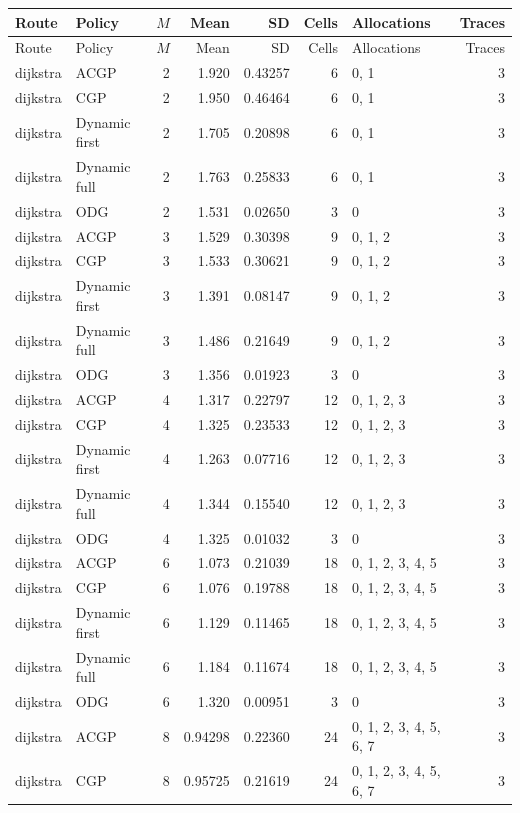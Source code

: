 \documentclass[10pt,a4paper]{article}
\begin{document}
\tiny\setlength{\tabcolsep}{2pt}\begin{longtable}{@{}p{23mm}p{29mm}rrrrp{36mm}r@{}}
\toprule Route & Policy & $M$ & Mean & SD & Cells & Allocations & Traces \\ \midrule\endfirsthead
\toprule Route & Policy & $M$ & Mean & SD & Cells & Allocations & Traces \\ \midrule\endhead
\bottomrule\endfoot
dijkstra & ACGP & 2 & 1.920 & 0.43257 & 6 & 0, 1 & 3 \\
dijkstra & CGP & 2 & 1.950 & 0.46464 & 6 & 0, 1 & 3 \\
dijkstra & Dynamic first & 2 & 1.705 & 0.20898 & 6 & 0, 1 & 3 \\
dijkstra & Dynamic full & 2 & 1.763 & 0.25833 & 6 & 0, 1 & 3 \\
dijkstra & ODG & 2 & 1.531 & 0.02650 & 3 & 0 & 3 \\
dijkstra & ACGP & 3 & 1.529 & 0.30398 & 9 & 0, 1, 2 & 3 \\
dijkstra & CGP & 3 & 1.533 & 0.30621 & 9 & 0, 1, 2 & 3 \\
dijkstra & Dynamic first & 3 & 1.391 & 0.08147 & 9 & 0, 1, 2 & 3 \\
dijkstra & Dynamic full & 3 & 1.486 & 0.21649 & 9 & 0, 1, 2 & 3 \\
dijkstra & ODG & 3 & 1.356 & 0.01923 & 3 & 0 & 3 \\
dijkstra & ACGP & 4 & 1.317 & 0.22797 & 12 & 0, 1, 2, 3 & 3 \\
dijkstra & CGP & 4 & 1.325 & 0.23533 & 12 & 0, 1, 2, 3 & 3 \\
dijkstra & Dynamic first & 4 & 1.263 & 0.07716 & 12 & 0, 1, 2, 3 & 3 \\
dijkstra & Dynamic full & 4 & 1.344 & 0.15540 & 12 & 0, 1, 2, 3 & 3 \\
dijkstra & ODG & 4 & 1.325 & 0.01032 & 3 & 0 & 3 \\
dijkstra & ACGP & 6 & 1.073 & 0.21039 & 18 & 0, 1, 2, 3, 4, 5 & 3 \\
dijkstra & CGP & 6 & 1.076 & 0.19788 & 18 & 0, 1, 2, 3, 4, 5 & 3 \\
dijkstra & Dynamic first & 6 & 1.129 & 0.11465 & 18 & 0, 1, 2, 3, 4, 5 & 3 \\
dijkstra & Dynamic full & 6 & 1.184 & 0.11674 & 18 & 0, 1, 2, 3, 4, 5 & 3 \\
dijkstra & ODG & 6 & 1.320 & 0.00951 & 3 & 0 & 3 \\
dijkstra & ACGP & 8 & 0.94298 & 0.22360 & 24 & 0, 1, 2, 3, 4, 5, 6, 7 & 3 \\
dijkstra & CGP & 8 & 0.95725 & 0.21619 & 24 & 0, 1, 2, 3, 4, 5, 6, 7 & 3 \\

\end{longtable}
\end{document}
